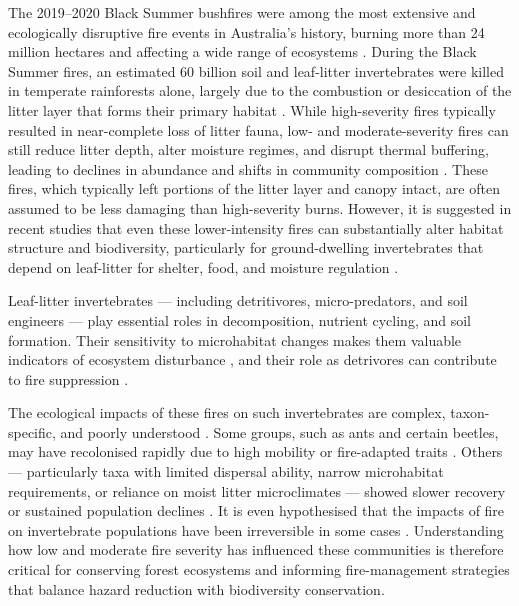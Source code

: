 The 2019--2020 Black Summer bushfires were among the most extensive and ecologically disruptive fire events in Australia’s history, burning more than 24 million hectares and affecting a wide range of ecosystems \parencite{royal-commission-2020}.
During the Black Summer fires, an estimated 60 billion soil and leaf-litter invertebrates were killed in temperate rainforests alone, largely due to the combustion or desiccation of the litter layer that forms their primary habitat \parencite{gibb-et-al-2023}.
While high-severity fires typically resulted in near-complete loss of litter fauna, low- and moderate-severity fires can still reduce litter depth, alter moisture regimes, and disrupt thermal buffering, leading to declines in abundance and shifts in community composition \parencite{brennan-et-al-2009}.
These fires, which typically left portions of the litter layer and canopy intact, are often assumed to be less damaging than high-severity burns.
However, it is suggested in recent studies that even these lower-intensity fires can substantially alter habitat structure and biodiversity, particularly for ground-dwelling invertebrates that depend on leaf-litter for shelter, food, and moisture regulation \parencite{york-2000, andrew-et-al-2000}.

Leaf-litter invertebrates --- including detritivores, micro-predators, and soil engineers --- play essential roles in decomposition, nutrient cycling, and soil formation.
Their sensitivity to microhabitat changes makes them valuable indicators of ecosystem disturbance \parencite{maleque-et-al-2009}, and their role as detrivores can contribute to fire suppression \parencite{gibb-et-al-2023}.

The ecological impacts of these fires on such invertebrates are complex, taxon-specific, and poorly understood \parencite{henry-et-al-2022}.
Some groups, such as ants and certain beetles, may have recolonised rapidly due to high mobility or fire-adapted traits \parencite{andersen-et-al-2012}.
Others --- particularly taxa with limited dispersal ability, narrow microhabitat requirements, or reliance on moist litter microclimates --- showed slower recovery or sustained population declines \parencite{brennan-et-al-2009}.
It is even hypothesised that the impacts of fire on invertebrate populations have been irreversible in some cases \parencite{holz-et-al-2015}.
Understanding how low and moderate fire severity has influenced these communities is therefore critical for conserving forest ecosystems and informing fire-management strategies that balance hazard reduction with biodiversity conservation.

